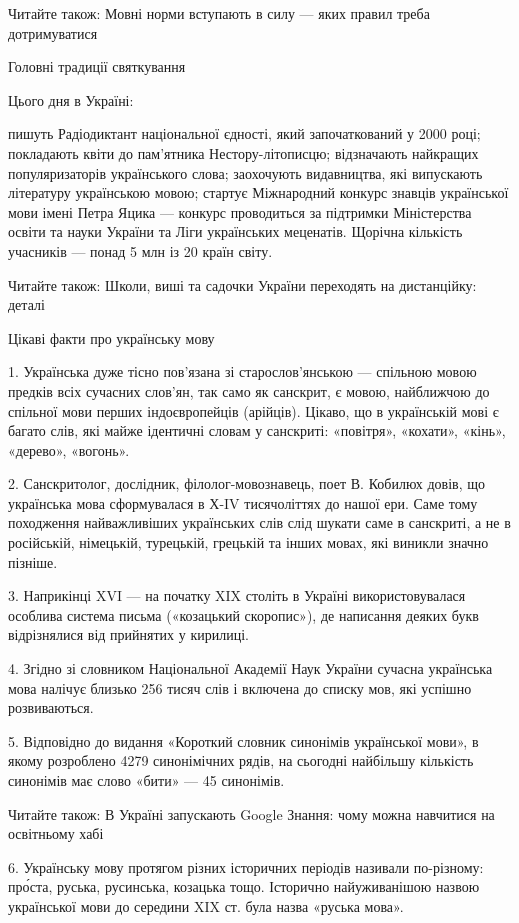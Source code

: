Читайте також: Мовні норми вступають в силу — яких правил треба дотримуватися

Головні традиції святкування

Цього дня в Україні:

пишуть Радіодиктант національної єдності, який започаткований у 2000 році;
покладають квіти до пам’ятника Нестору-літописцю;
відзначають найкращих популяризаторів українського слова;
заохочують видавництва, які випускають літературу українською мовою;
стартує Міжнародний конкурс знавців української мови імені Петра Яцика — конкурс проводиться за підтримки Міністерства освіти та науки України та Ліги українських меценатів. Щорічна кількість учасників — понад 5 млн із 20 країн світу.

Читайте також: Школи, виші та садочки України переходять на дистанційку: деталі

Цікаві факти про українську мову

1. Українська дуже тісно пов’язана зі старослов’янською — спільною мовою
предків всіх сучасних слов’ян, так само як санскрит, є мовою, найближчою до
спільної мови перших індоєвропейців (арійців). Цікаво, що в українській мові є
багато слів, які майже ідентичні словам у санскриті: «повітря», «кохати»,
«кінь», «дерево», «вогонь».

2. Санскритолог, дослідник, філолог-мовознавець, поет В. Кобилюх довів, що
українська мова сформувалася в Х-IV тисячоліттях до нашої ери. Саме тому
походження найважливіших українських слів слід шукати саме в санскриті, а не в
російській, німецькій, турецькій, грецькій та інших мовах, які виникли значно
пізніше.

3. Наприкінці XVI — на початку XIX століть в Україні використовувалася особлива
система письма («козацький скоропис»), де написання деяких букв відрізнялися
від прийнятих у кирилиці.

4. Згідно зі словником Національної Академії Наук України сучасна українська
мова налічує близько 256 тисяч слів і включена до списку мов, які успішно
розвиваються.

5. Відповідно до видання «Короткий словник синонімів української мови», в якому
розроблено 4279 синонімічних рядів, на сьогодні найбільшу кількість синонімів
має слово «бити» — 45 синонімів.

Читайте також: В Україні запускають Google Знання: чому можна навчитися на
освітньому хабі

6. Українську мову протягом різних історичних періодів називали по-різному:
про́ста, руська, русинська, козацька тощо. Історично найуживанішою назвою
української мови до середини XIX ст. була назва «руська мова».

